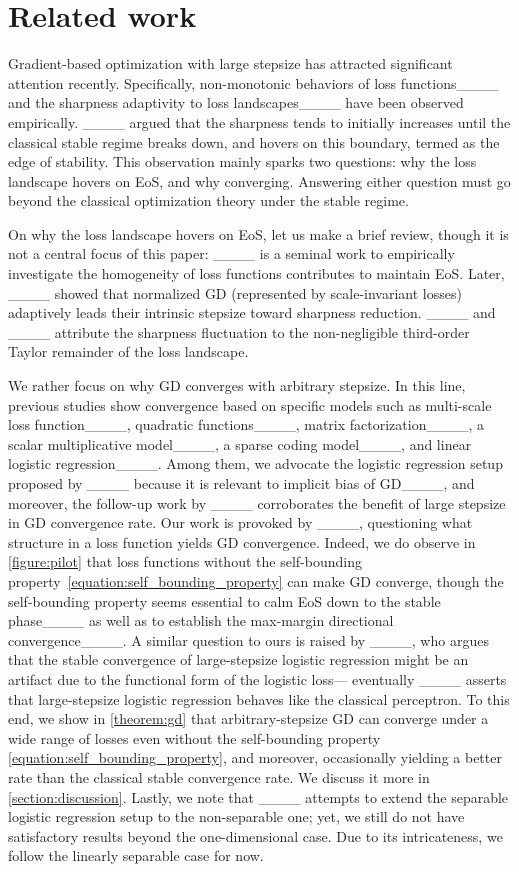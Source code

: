 \section{Related work}
\label{section:related}
Gradient-based optimization with large stepsize has attracted significant attention recently.
Specifically, non-monotonic behaviors of loss functions____ and the sharpness adaptivity to loss landscapes____ have been observed empirically.
____ argued that the sharpness tends to initially increases until the classical stable regime breaks down, and hovers on this boundary, termed as the edge of stability.
This observation mainly sparks two questions: why the loss landscape hovers on EoS, and why converging.
Answering either question must go beyond the classical optimization theory under the stable regime.

On why the loss landscape hovers on EoS, let us make a brief review, though it is not a central focus of this paper: ____ is a seminal work to empirically investigate the homogeneity of loss functions contributes to maintain EoS.
Later, ____ showed that normalized GD (represented by scale-invariant losses) adaptively leads their intrinsic stepsize toward sharpness reduction.
____ and ____ attribute the sharpness fluctuation to the non-negligible third-order Taylor remainder of the loss landscape.

We rather focus on why GD converges with arbitrary stepsize.
In this line, previous studies show convergence based on specific models such as multi-scale loss function____, quadratic functions____, matrix factorization____, a scalar multiplicative model____, a sparse coding model____, and linear logistic regression____.
Among them, we advocate the logistic regression setup proposed by ____ because it is relevant to implicit bias of GD____, and moreover, the follow-up work by ____ corroborates the benefit of large stepsize in GD convergence rate.
Our work is provoked by ____, questioning what structure in a loss function yields GD convergence.
Indeed, we do observe in \cref{figure:pilot} that loss functions without the self-bounding property~\eqref{equation:self_bounding_property} can make GD converge, though the self-bounding property seems essential to calm EoS down to the stable phase____ as well as to establish the max-margin directional convergence____. 
A similar question to ours is raised by ____, who argues that the stable convergence of large-stepsize logistic regression might be an artifact due to the functional form of the logistic loss---%
eventually ____ asserts that large-stepsize logistic regression behaves like the classical perceptron.
To this end, we show in \cref{theorem:gd} that arbitrary-stepsize GD can converge under a wide range of losses even without the self-bounding property \eqref{equation:self_bounding_property},
and moreover, occasionally yielding a better rate than the classical stable convergence rate.
We discuss it more in \cref{section:discussion}.
Lastly, we note that ____ attempts to extend the separable logistic regression setup to the non-separable one; yet, we still do not have satisfactory results beyond the one-dimensional case.
Due to its intricateness, we follow the linearly separable case for now.